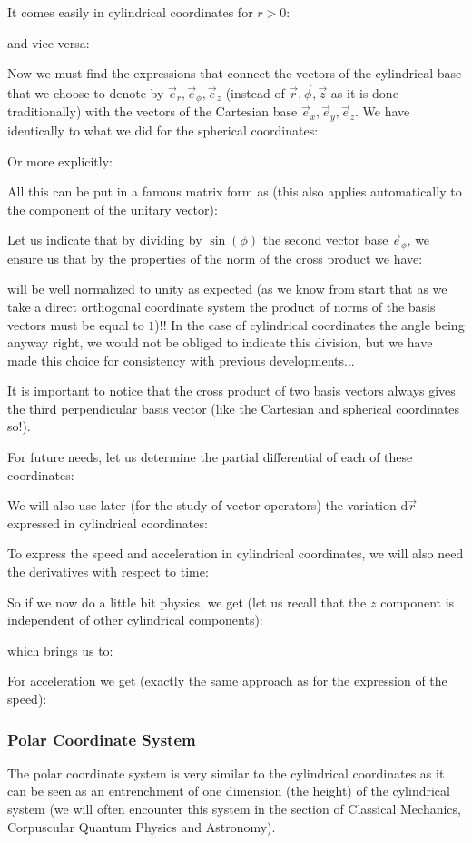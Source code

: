 	It comes easily in cylindrical coordinates for $r>0$:
	
	and vice versa:
	 
	Now we must find the expressions that connect the vectors of the cylindrical base that we choose to denote by $\vec{e}_r,\vec{e}_\phi,\vec{e}_z$ (instead of $\vec{r}, \vec{\phi},\vec{z}$ as it is done traditionally) with the vectors of the Cartesian base $\vec{e}_x,\vec{e}_y,\vec{e}_z$. We have identically to what we did for the spherical coordinates:
	
	Or more explicitly:
	
	All this can be put in a famous matrix form as (this also applies automatically to the component of the unitary vector):
	
	Let us indicate that by dividing by $\sin(\phi)$ the second vector base $\vec{e}_\phi$, we ensure us that by the properties of the norm of the cross product we have:
	
	will be well normalized to unity as expected (as we know from start that as we take a direct orthogonal coordinate system the product of norms of the basis vectors must be equal to $1$)!! In the case of cylindrical coordinates the angle being anyway right, we would not be obliged to indicate this division, but we have made this choice for consistency with previous developments...
	
	\begin{tcolorbox}[title=Remark,colframe=black,arc=10pt]
	It is important to notice that the cross product of two basis vectors always gives the third perpendicular  basis vector (like the Cartesian and spherical coordinates so!).
	\end{tcolorbox}
	For future needs, let us determine the partial differential of each of these coordinates:
	
	We will also use later (for the study of vector operators) the variation $\mathrm{d}\vec{r}$ expressed in cylindrical coordinates:
	
	To express the speed and acceleration in cylindrical coordinates, we will also need the derivatives with respect to time:
	
	So if we now do a little bit physics, we get (let us recall that the $z$ component is independent of other cylindrical components):
	
	which brings us to:
	
	For acceleration we get (exactly the same approach as for the expression of the speed):
	
	
	\subsubsection{Polar Coordinate System}\label{polar coordinates}
	The polar coordinate system is very similar to the cylindrical coordinates as it can be seen as an entrenchment of one dimension (the height) of the cylindrical system (we will often encounter this system in the section of Classical Mechanics, Corpuscular Quantum Physics and Astronomy).


